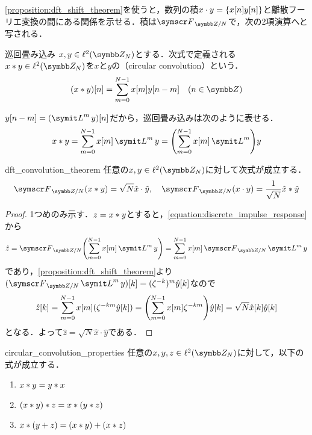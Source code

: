 \documentclass[../../main]{subfiles}
\begin{document}
\cref{proposition:dft_shift_theorem}を使うと，数列の積\(x\cdot y=\lbrace x[n]y[n]\rbrace\)と離散フーリエ変換の間にある関係を示せる．積は\(\dft{N}\)で，次の2項演算へと写される．

\begin{definition}{巡回畳み込み}{}
  \(x,y\in\cycles{N}\)とする．次式で定義される\(x\circconv y\in\cycles{N}\)を\(x\)と\(y\)の（circular convolution）という．
  \[
    (x\circconv y)[n] = \sum_{m=0}^{N-1}x[m]y[n-m]\quad(n\in\numset{Z})
  \]
\end{definition}

\(y[n-m]=(\lagop^my)[n]\)だから，巡回畳み込みは次のように表せる．
\begin{equation}
  \label{equation:discrete_impulse_response}
  x\circconv y = \sum_{m=0}^{N-1}x[m]\lagop^my
  = \pqty*{\sum_{m=0}^{N-1}x[m]\lagop^m}y
\end{equation}

\begin{proposition}{}{dft_convolution_theorem}
  任意の\(x,y\in\cycles{N}\)に対して次式が成立する．
  \[
    \dft{N}(x\circconv y) = \sqrt{N}\hat{x}\cdot\hat{y},
    \quad\dft{N}(x\cdot y) = \frac{1}{\sqrt{N}}\hat{x}\circconv\hat{y}
  \]
\end{proposition}

\begin{proof}
  1つめのみ示す．\(z=x\ast y\)とすると，\cref{equation:discrete_impulse_response}から
  \[
    \hat{z} = \dft{N}\pqty*{\sum_{m=0}^{N-1}x[m]\lagop^my}
    = \sum_{m=0}^{N-1}x[m]\dft{N}\lagop^my
  \]
  であり，\cref{proposition:dft_shift_theorem}より\((\dft{N}\lagop^my)[k]=(\zeta^{-k})^m\hat{y}[k]\)なので
  \[
    \hat{z}[k] = \sum_{m=0}^{N-1}x[m](\zeta^{-km}\hat{y}[k])
    = \pqty*{\sum_{m=0}^{N-1}x[m]\zeta^{-km}}\hat{y}[k]
    = \sqrt{N}\hat{x}[k]\hat{y}[k]
  \]
  となる．よって\(\hat{z}=\sqrt{N}\hat{x}\cdot\hat{y}\)である．
\end{proof}

\begin{corollary}{}{circular_convolution_properties}
  任意の\(x,y,z\in\cycles{N}\)に対して，以下の式が成立する．
  \begin{enumerate}
    \item \(x\ast y=y\ast x\)
    \item \((x\ast y)\ast z=x\ast (y\ast z)\)
    \item \(x\ast(y+z)=(x\ast y)+(x\ast z)\)
  \end{enumerate}
\end{corollary}
\end{document}
